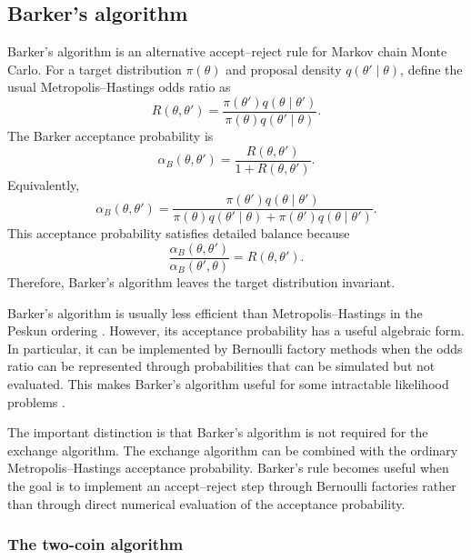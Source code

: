 \subsection{Barker's algorithm}

Barker's algorithm \cite{barker1965} is an alternative accept--reject rule for Markov chain Monte Carlo.
For a target distribution $\pi(\theta)$ and proposal density $q(\theta' \mid \theta)$, define the usual Metropolis--Hastings odds ratio as
\begin{equation}
R(\theta,\theta')
=
\frac{\pi(\theta')q(\theta \mid \theta')}
{\pi(\theta)q(\theta' \mid \theta)}.
\end{equation}
The Barker acceptance probability is
\begin{equation}
\alpha_B(\theta,\theta')
=
\frac{R(\theta,\theta')}
{1+R(\theta,\theta')}.
\end{equation}
Equivalently,
\begin{equation}
\alpha_B(\theta,\theta')
=
\frac{\pi(\theta')q(\theta \mid \theta')}
{\pi(\theta)q(\theta' \mid \theta)+\pi(\theta')q(\theta \mid \theta')}.
\end{equation}
This acceptance probability satisfies detailed balance because
\begin{equation}
\frac{\alpha_B(\theta,\theta')}
{\alpha_B(\theta',\theta)}
=
R(\theta,\theta').
\end{equation}
Therefore, Barker's algorithm leaves the target distribution invariant.

Barker's algorithm is usually less efficient than Metropolis--Hastings in the Peskun ordering 
\cite{goncalves2017}.
However, its acceptance probability has a useful algebraic form.
In particular, it can be implemented by Bernoulli factory methods when the odds ratio can be represented through probabilities that can be simulated but not evaluated.
This makes Barker's algorithm useful for some intractable likelihood problems \cite{goncalves2017, vats2021}.

The important distinction is that Barker's algorithm is not required for the exchange algorithm.
The exchange algorithm can be combined with the ordinary Metropolis--Hastings acceptance probability.
Barker's rule becomes useful when the goal is to implement an accept--reject step through Bernoulli factories rather than through direct numerical evaluation of the acceptance probability.

\subsubsection{The two-coin algorithm}

